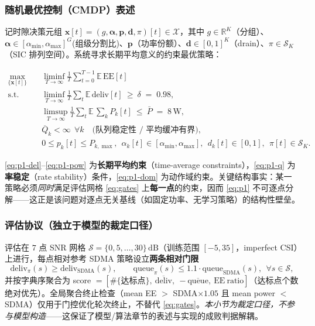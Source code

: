 \documentclass[UTF8,11pt,a4paper]{ctexart}
\theoremstyle{plain}
\theoremstyle{definition}
\theoremstyle{remark}
\newcommand{\R}{\mathbb{R}}
\newcommand{\E}{\mathbb{E}}
\newcommand{\vect}[1]{\mathbf{#1}}
\begin{document}
\subsubsection{随机最优控制（CMDP）表述}

记时隙决策元组 $\vect x[t]=(g,\vect\alpha,\vect p,\vect d,\pi)[t]\in\mathcal X$，其中 $g\in\R^{K}$（分组）、$\vect\alpha\in[\alpha_{\min},\alpha_{\max}]^{G}$(组级分割比)、$\vect p$（功率份额）、$\vect d\in[0,1]^{K}$（drain）、$\pi\in\mathcal S_K$（SIC 排列空间）。系统寻求长期平均意义的约束最优策略：

\begin{subequations}\label{eq:p1}
\begin{align}
  \max_{\{\vect x[t]\}}\quad & \liminf_{T\to\infty}\frac{1}{T}\sum_{t=0}^{T-1}\E\,\mathrm{EE}[t] \label{eq:p1-obj}\\
  \text{s.t.}\quad & \liminf_{T\to\infty}\frac{1}{T}\sum_{t}\E\,\mathrm{deliv}[t]\ \ge\ \delta \;=\; 0.98, \label{eq:p1-del}\\
  & \limsup_{T\to\infty}\frac{1}{T}\sum_{t}\E\,\textstyle\sum_k P_k[t]\ \le\ \bar P \;=\; 8\,\mathrm{W}, \label{eq:p1-pow}\\
  & \overline Q_k < \infty\ \ \forall k \quad\text{(队列稳定性 / 平均缓冲有界)}, \label{eq:p1-q}\\
  & 0\le p_k[t]\le P_{k,\max},\ \ \alpha_k[t]\in[\alpha_{\min},\alpha_{\max}],\ \ d_k[t]\in[0,1],\ \ \pi[t]\in\mathcal S_K. \label{eq:p1-dom}
\end{align}
\end{subequations}

\eqref{eq:p1-del}--\eqref{eq:p1-pow} 为\textbf{长期平均约束}（time-average constraints），\eqref{eq:p1-q} 为\textbf{率稳定}（rate stability）条件，\eqref{eq:p1-dom} 为动作域约束。关键结构事实：某一策略必须\emph{同时}满足评估网格 \eqref{eq:gates} 上\textbf{每一点}的约束，因而 \eqref{eq:p1} 不可逐点分解——这正是该问题对逐点无关基线（如固定功率、无学习策略）的结构性壁垒。

\subsubsection{评估协议（独立于模型的裁定口径）} \label{sec:protocol}

评估在 $7$ 点 SNR 网格 $\mathcal S=\{0,5,\dots,30\}\,\mathrm{dB}$（训练范围 $[-5,35]$，imperfect CSI）上进行，每点相对参考 SDMA 策略设立\textbf{两条相对门限}
\begin{equation}
  \mathrm{deliv}_{\pi}(s) \ge \mathrm{deliv}_{\mathrm{SDMA}}(s),\qquad
  \mathrm{queue}_{\pi}(s) \le 1.1\cdot\mathrm{queue}_{\mathrm{SDMA}}(s),\ \ \forall s\in\mathcal S,
  \label{eq:gates}
\end{equation}
并按字典序聚合为 score $=[\#\{\text{达标点}\},\ \overline{\mathrm{deliv}},\ -\overline{\mathrm{queue}},\ \mathrm{EE\ ratio}]$（达标点个数绝对优先）。全局聚合终止检查（mean EE $>$ SDMA$\times1.05$ 且 mean power $<$ SDMA）仅用于门控优化轮次终止，不替代 \eqref{eq:gates}。\emph{本小节为裁定口径，不参与模型构造}——这保证了模型/算法章节的表述与实现的成败判据解耦。
\end{document}
